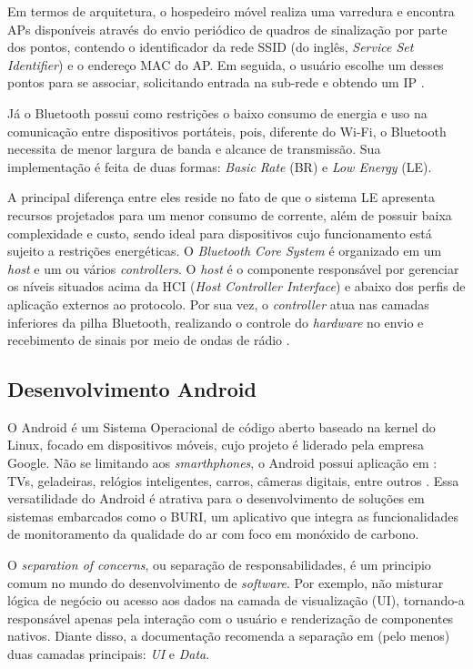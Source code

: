 \documentclass[alpha-refs,brazilian]{RBCA_v3.0}
\begin{document}
Em termos de arquitetura, o hospedeiro móvel realiza uma varredura e encontra APs disponíveis 
através do envio periódico de quadros de sinalização por parte dos pontos, contendo o identificador da rede SSID (do inglês, \textit{Service Set Identifier}) e o endereço MAC do AP. Em seguida, o usuário escolhe um desses pontos para 
se associar, solicitando entrada na sub-rede e obtendo um IP \citep{redeskurose2010}.

Já o Bluetooth possui como restrições o baixo consumo de energia e uso na comunicação entre dispositivos portáteis, pois, diferente do Wi-Fi, o Bluetooth 
necessita de menor largura de banda e alcance de transmissão. Sua implementação é feita de duas formas: \textit{Basic Rate} (BR) e \textit{Low Energy} (LE). 

A principal diferença entre eles reside no fato de que o sistema LE apresenta recursos projetados para um menor consumo de corrente, além de possuir baixa complexidade e custo, sendo ideal 
para dispositivos cujo funcionamento está sujeito a restrições energéticas. O \textit{Bluetooth Core System} é organizado em um \textit{host} e um ou vários \textit{controllers}. O \textit{host} é o componente 
responsável por gerenciar os níveis situados acima da HCI (\textit{Host Controller Interface}) e abaixo dos perfis de aplicação externos ao protocolo. Por sua vez, o \textit{controller} atua nas camadas inferiores 
da pilha Bluetooth, realizando o controle do \textit{hardware} no envio e recebimento de sinais por meio de ondas de rádio \citep{bluetooth-documentation}.

\subsection{Desenvolvimento Android}\label{sec01:sub3:android}

O Android é um Sistema Operacional de código aberto baseado na kernel do Linux, focado em dispositivos móveis, cujo projeto é liderado pela 
empresa Google. Não se limitando aos \textit{smarthphones}, o Android possui aplicação em : TVs, geladeiras, relógios inteligentes, carros, 
câmeras digitais, entre outros \citep{google-developers}. Essa versatilidade do Android é atrativa para o desenvolvimento de soluções em sistemas 
embarcados como o BURI, um aplicativo que integra as funcionalidades de monitoramento da qualidade do ar com foco em monóxido de carbono.

O \textit{separation of concerns}, ou separação de responsabilidades, é um principio comum no mundo do desenvolvimento de \textit{software}. Por exemplo, não misturar lógica de 
negócio ou acesso aos dados na camada de visualização (UI), tornando-a  responsável apenas pela interação com o usuário e renderização de componentes nativos. Diante disso, a 
documentação recomenda a separação em (pelo menos) duas camadas principais: \textit{UI} e \textit{Data}. 
\end{document}
